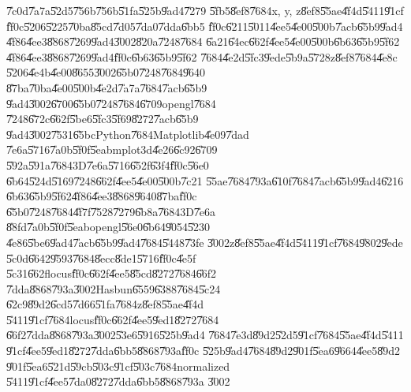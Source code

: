 \U{7c0d}\U{7a7a}\U{52d5}\U{756b}\U{756b}\U{51fa}\U{525b}\U{9ad4}\U{7279}%
\U{5fb5}\U{8ef8}\U{7684}x, y, z\U{8ef8}\U{55ae}\U{4f4d}\U{5411}\U{91cf}%
\U{ff0c}\U{5206}\U{5225}\U{70ba}\U{85cd}\U{7d05}\U{7da0}\U{7dda}\U{6bb5}%
\U{ff0c}\U{6211}\U{5011}\U{4ee5}\U{4e00}\U{500b}\U{7acb}\U{65b9}\U{9ad4}%
\U{4f86}\U{4ee3}\U{8868}\U{7269}\U{9ad4}\U{3002}\U{820a}\U{7248}\U{7684}%
\U{6a21}\U{64ec}\U{662f}\U{4ee5}\U{4e00}\U{500b}\U{6b63}\U{65b9}\U{5f62}%
\U{4f86}\U{4ee3}\U{8868}\U{7269}\U{9ad4}\U{ff0c}\U{6b63}\U{65b9}\U{5f62}%
\U{7684}\U{4e2d}\U{5fc3}\U{9ede}\U{5b9a}\U{5728}z\U{8ef8}\U{7684}\U{4e8c}%
\U{5206}\U{4e4b}\U{4e00}\U{8655}\U{3002}\U{65b0}\U{7248}\U{7684}\U{9640}%
\U{87ba}\U{70ba}\U{4e00}\U{500b}\U{4e2d}\U{7a7a}\U{7684}\U{7acb}\U{65b9}%
\U{9ad4}\U{3002}\U{6700}\U{65b0}\U{7248}\U{7684}\U{6709}opengl\U{7684}%
\U{7248}\U{672c}\U{662f}\U{5be6}\U{5fc3}\U{5f69}\U{8272}\U{7acb}\U{65b9}%
\U{9ad4}\U{3002}\U{7531}\U{65bc}Python\U{7684}Matplotlib\U{4e09}\U{7dad}%
\U{7e6a}\U{5716}\U{7a0b}\U{5f0f}\U{5eab}mplot3d\U{4e26}\U{6c92}\U{6709}%
\U{592a}\U{591a}\U{7684}3D\U{7e6a}\U{5716}\U{652f}\U{63f4}\U{ff0c}\U{56e0}%
\U{6b64}\U{524d}\U{5169}\U{7248}\U{662f}\U{4ee5}\U{4e00}\U{500b}\U{7c21}%
\U{55ae}\U{7684}\U{793a}\U{610f}\U{7684}\U{7acb}\U{65b9}\U{9ad4}\U{6216}%
\U{6b63}\U{65b9}\U{5f62}\U{4f86}\U{4ee3}\U{8868}\U{9640}\U{87ba}\U{ff0c}%
\U{65b0}\U{7248}\U{7684}\U{4f7f}\U{7528}\U{7279}\U{6b8a}\U{7684}3D\U{7e6a}%
\U{88fd}\U{7a0b}\U{5f0f}\U{5eab}opengl\U{56e0}\U{6b64}\U{9054}\U{5230}%
\U{4e86}\U{5be6}\U{9ad4}\U{7acb}\U{65b9}\U{9ad4}\U{7684}\U{5448}\U{73fe}%
\U{3002}z\U{8ef8}\U{55ae}\U{4f4d}\U{5411}\U{91cf}\U{7684}\U{9802}\U{9ede}%
\U{5c0d}\U{6642}\U{9593}\U{7684}\U{8ecc}\U{8de1}\U{5716}\U{ff0c}\U{4e5f}%
\U{5c31}\U{662f}locus\U{ff0c}\U{662f}\U{4ee5}\U{85cd}\U{8272}\U{7684}\U{66f2}%
\U{7dda}\U{8868}\U{793a}\U{3002}Hasbun\U{6559}\U{6388}\U{7684}\U{5c24}%
\U{62c9}\U{89d2}\U{6cd5}\U{7d66}\U{51fa}\U{7684}z\U{8ef8}\U{55ae}\U{4f4d}%
\U{5411}\U{91cf}\U{7684}locus\U{ff0c}\U{662f}\U{4ee5}\U{9ed1}\U{8272}\U{7684}%
\U{66f2}\U{7dda}\U{8868}\U{793a}\U{3002}\U{53e6}\U{5916}\U{525b}\U{9ad4}%
\U{7684}\U{7e3d}\U{89d2}\U{52d5}\U{91cf}\U{7684}\U{55ae}\U{4f4d}\U{5411}%
\U{91cf}\U{4ee5}\U{9ed1}\U{8272}\U{7dda}\U{6bb5}\U{8868}\U{793a}\U{ff0c}%
\U{525b}\U{9ad4}\U{7684}\U{89d2}\U{901f}\U{5ea6}\U{9664}\U{4ee5}\U{89d2}%
\U{901f}\U{5ea6}\U{521d}\U{59cb}\U{503c}\U{91cf}\U{503c}\U{7684}normalized%
\U{5411}\U{91cf}\U{4ee5}\U{7da0}\U{8272}\U{7dda}\U{6bb5}\U{8868}\U{793a}%
\U{3002}

